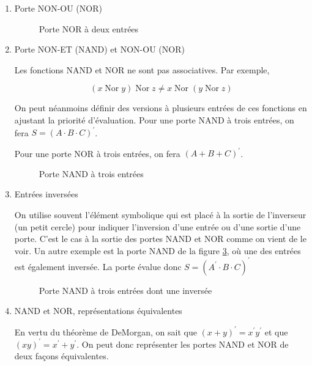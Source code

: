 \documentclass[letter, oneside]{book}
\begin{document}
\begin{enumerate}
\item Porte NON-OU (NOR)
\label{sec:org53ed393}

\begin{figure}[htbp]
\centering

\caption{\label{fig:org01c0dcf}Porte NOR à deux entrées}
\end{figure}

\item Porte NON-ET (NAND) et NON-OU (NOR)
\label{sec:orga6b3d9a}

Les fonctions NAND et NOR ne sont pas associatives. Par exemple,

$$
(x \operatorname{Nor} y) \operatorname{Nor} z \neq x \operatorname{Nor} (y \operatorname{Nor} z) 
$$

On peut néanmoins définir des versions à plusieurs entrées de ces
fonctions en ajustant la priorité d'évaluation. Pour une porte NAND à
trois entrées, on fera \(S = (A \cdot B \cdot C)^\prime\).

Pour une porte NOR à trois entrées, on fera \((A + B + C)^\prime\).

\begin{figure}[htbp]
\centering

\caption{\label{fig:org2150810}Porte NAND à trois entrées}
\end{figure}

\item Entrées inversées
\label{sec:orge1814e7}

On utilise souvent l'élément symbolique qui est placé à la sortie de
l'inverseur (un petit cercle) pour indiquer l'inversion d'une entrée
ou d'une sortie d'une porte. C'est le cas à la sortie des portes NAND
et NOR comme on vient de le voir. Un autre exemple est la porte NAND
de la figure \ref{fig:org226ba60}, où une des entrées est également
inversée. La porte évalue donc \(S =  (A^\prime \cdot B  \cdot C)^\prime\)

\begin{figure}[htbp]
\centering

\caption{\label{fig:org226ba60}Porte NAND à trois entrées dont une inversée}
\end{figure} 

\item NAND et NOR, représentations équivalentes
\label{sec:org7fb0ad2}

En vertu du théorème de DeMorgan, on sait que \((x + y)^{\prime} =
x^{\prime} y^{\prime}\) et que \((xy)^{\prime} = x^{\prime} +
y^{\prime}\). On peut donc représenter les portes NAND et NOR de deux
façons équivalentes.


\end{enumerate}
\end{document}

